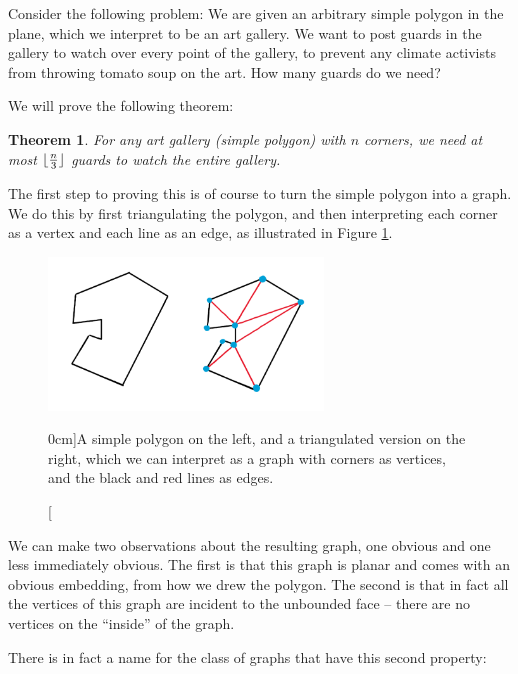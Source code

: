 \documentclass[nobib]{tufte-handout}
\newtheorem{theorem}{Theorem}
\DeclarePairedDelimiter\floor{\lfloor}{\rfloor}
\begin{document}
Consider the following problem: We are given an arbitrary simple polygon in the plane, which we interpret to be an art gallery. We want to post guards in the gallery to watch over every point of the gallery, to prevent any climate activists from throwing tomato soup on the art. How many guards do we need?

We will prove the following theorem:

\begin{theorem}
  For any art gallery (simple polygon) with $n$ corners, we need at most $\floor{\frac{n}{3}}$ guards to watch the entire gallery.
\end{theorem}

The first step to proving this is of course to turn the simple polygon into a graph. We do this by first triangulating the polygon, and then interpreting each corner as a vertex and each line as an edge, as illustrated in Figure \ref{fig:triangulated_polygon}.

\begin{figure}
  \centering
  \includegraphics[width=0.65\textwidth]{graphics/L12_colouring/triangulated_polygon.png}
  \caption[][0cm]{A simple polygon on the left, and a triangulated version on the right, which we can interpret as a graph with corners as vertices, and the black and red lines as edges.}
  \label{fig:triangulated_polygon}
\end{figure}

We can make two observations about the resulting graph, one obvious and one less immediately obvious. The first is that this graph is planar and comes with an obvious embedding, from how we drew the polygon. The second is that in fact all the vertices of this graph are incident to the unbounded face -- there are no vertices on the ``inside'' of the graph.

There is in fact a name for the class of graphs that have this second property:
\end{document}
